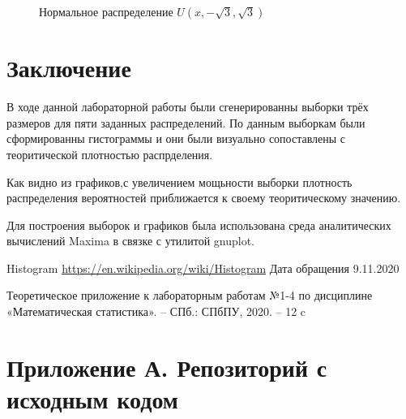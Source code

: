 \documentclass[12pt]{article}
\begin{document}
\begin{flushleft}
\begin{figure}[h!]
\begin{minipage}[h]{0.325\linewidth}
        \end{minipage}
        \caption{Нормальное распределение $U(x, -\sqrt{3}, \sqrt{3})$}
    \end{figure}

\newpage

\section*{Заключение}

В ходе данной лабораторной работы были сгенерированны выборки трёх размеров для пяти заданных распределений. По данным выборкам были сформированны гистограммы и они были визуально сопоставлены с теоритической плотностью распрделения.

Как видно из графиков,с увеличением мощьности выборки плотность распределения вероятностей приближается к своему теоритическому значению.

Для построения выборок и графиков была использована среда аналитических вычислений Maxima в связке с утилитой gnuplot.

\newpage


\begin{thebibliography}{9}
        Histogram \url{https://en.wikipedia.org/wiki/Histogram} Дата обращения 9.11.2020
    
        Теоретическое приложение к лабораторным работам №1-4 по дисциплине «Математическая статистика». -- СПб.: СПбПУ, 2020. -- 12 c 
	
\end{thebibliography}

\newpage

\section*{Приложение А. Репозиторий с исходным кодом}

\end{flushleft}
\end{document}
